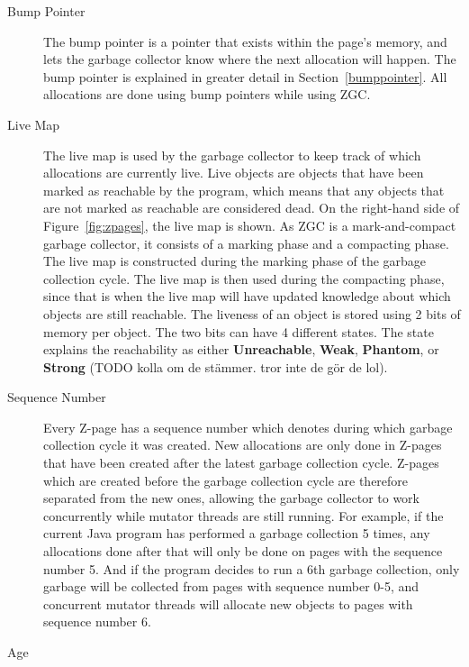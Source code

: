 \begin{description}
    \item[Bump Pointer]
        The bump pointer is a pointer that exists within the page's memory, and lets the garbage collector know where the next allocation will happen. The bump pointer is explained in greater detail in Section~\ref{bumppointer}. All allocations are done using bump pointers while using ZGC.
    \item[Live Map]
        The live map is used by the garbage collector to keep track of which allocations are currently live. Live objects are objects that have been marked as reachable by the program, which means that any objects that are not marked as reachable are considered dead. On the right-hand side of Figure~\ref*{fig:zpages}, the live map is shown. As ZGC is a mark-and-compact garbage collector, it consists of a marking phase and a compacting phase. The live map is constructed during the marking phase of the garbage collection cycle. The live map is then used during the compacting phase, since that is when the live map will have updated knowledge about which objects are still reachable. The liveness of an object is stored using 2 bits of memory per object. The two bits can have 4 different states. The state explains the reachability as either \textbf{Unreachable}, \textbf{Weak}, \textbf{Phantom}, or \textbf{Strong} (TODO kolla om de stämmer. tror inte de gör de lol).
    \item[Sequence Number]
        Every Z-page has a sequence number which denotes during which garbage collection cycle it was created. New allocations are only done in Z-pages that have been created after the latest garbage collection cycle. Z-pages which are created before the garbage collection cycle are therefore separated from the new ones, allowing the garbage collector to work concurrently while mutator threads are still running. For example, if the current Java program has performed a garbage collection 5 times, any allocations done after that will only be done on pages with the sequence number 5. And if the program decides to run a 6th garbage collection, only garbage will be collected from pages with sequence number 0-5, and concurrent mutator threads will allocate new objects to pages with sequence number 6.
    \item[Age]

\end{description}
